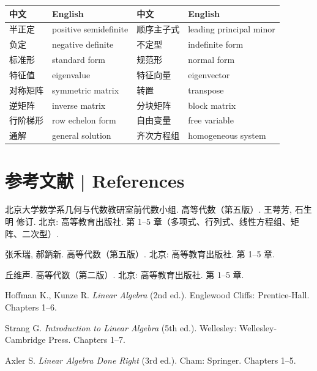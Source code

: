 \documentclass[UTF8,11pt,a4paper]{ctexart}
\begin{document}
\medskip
\small\setlength{\tabcolsep}{2.5pt}
\begin{tabular}{p{3.1cm}p{4.55cm}p{3.1cm}p{4.55cm}}
\toprule
中文 & English & 中文 & English\\
\midrule
半正定 & positive semidefinite & 顺序主子式 & leading principal minor\\
负定 & negative definite & 不定型 & indefinite form\\
标准形 & standard form & 规范形 & normal form\\
特征值 & eigenvalue & 特征向量 & eigenvector\\
对称矩阵 & symmetric matrix & 转置 & transpose\\
逆矩阵 & inverse matrix & 分块矩阵 & block matrix\\
行阶梯形 & row echelon form & 自由变量 & free variable\\
通解 & general solution & 齐次方程组 & homogeneous system\\
\bottomrule
\end{tabular}
\normalsize

\section*{参考文献 | References}
\begin{enumerate}[label={[\arabic*]},itemsep=0pt,topsep=2pt]
\item 北京大学数学系几何与代数教研室前代数小组. 高等代数（第五版）. 王萼芳, 石生明 修订. 北京: 高等教育出版社. 第 1--5 章（多项式、行列式、线性方程组、矩阵、二次型）.
\item 张禾瑞, 郝鈵新. 高等代数（第五版）. 北京: 高等教育出版社. 第 1--5 章.
\item 丘维声. 高等代数（第二版）. 北京: 高等教育出版社. 第 1--5 章.
\item Hoffman K., Kunze R. \emph{Linear Algebra} (2nd ed.). Englewood Cliffs: Prentice-Hall. Chapters 1--6.
\item Strang G. \emph{Introduction to Linear Algebra} (5th ed.). Wellesley: Wellesley-Cambridge Press. Chapters 1--7.
\item Axler S. \emph{Linear Algebra Done Right} (3rd ed.). Cham: Springer. Chapters 1--5.
\end{enumerate}
\end{document}
